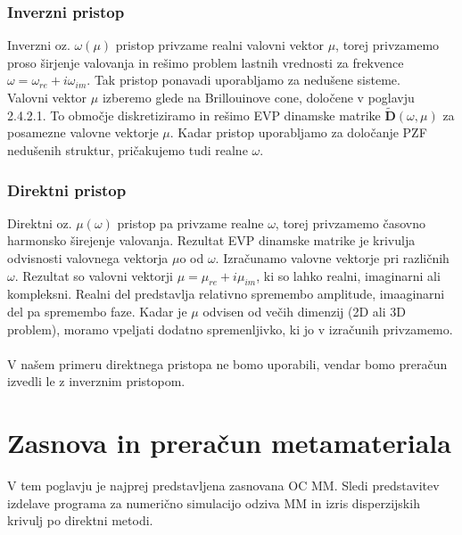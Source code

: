 \documentclass[12pt]{report}
\begin{document}
\subsection{Inverzni pristop}
Inverzni oz. $\omega(\mu)$ pristop privzame realni valovni vektor $\mu$, torej privzamemo proso širjenje valovanja in rešimo problem lastnih vrednosti za frekvence $\omega = \omega_{re} + i\omega_{im}$. Tak pristop ponavadi 
uporabljamo za nedušene sisteme. \cite{vanbelle} \\
Valovni vektor $\mu$ izberemo glede na Brillouinove cone, določene v poglavju 2.4.2.1. To območje diskretiziramo in rešimo \ac{EVP} dinamske matrike $\mathbf{\widetilde{D}}(\omega, \mu)$ za posamezne valovne vektorje $\mu$.
Kadar pristop uporabljamo za določanje \ac{PZF} nedušenih struktur, pričakujemo tudi realne $\omega$. \cite{kosir}

\subsection{Direktni pristop}
Direktni oz. $\mu(\omega)$ pristop pa privzame realne $\omega$, torej privzamemo časovno harmonsko širejenje valovanja. Rezultat \ac{EVP} dinamske matrike je krivulja odvisnosti valovnega vektorja $\mu$o
od $\omega$. Izračunamo valovne vektorje pri različnih $\omega$. Rezultat so valovni vektorji $\mu = \mu_{re} + i\mu_{im}$, ki so lahko realni, imaginarni ali kompleksni. Realni del predstavlja relativno spremembo amplitude, imaaginarni del pa
spremembo faze. \cite{vanbelle, kosir} Kadar je $\mu$ odvisen od večih dimenzij (2D ali 3D problem), moramo vpeljati dodatno spremenljivko, ki jo v izračunih privzamemo.
\\
\\
V našem primeru direktnega pristopa ne bomo uporabili, vendar bomo preračun izvedli le z inverznim pristopom.

\chapter{Zasnova in preračun metamateriala}
V tem poglavju je najprej predstavljena zasnovana \ac{OC} \ac{MM}. Sledi predstavitev izdelave programa za numerično simulacijo odziva \ac{MM} in izris disperzijskih krivulj po direktni
metodi.
\end{document}
